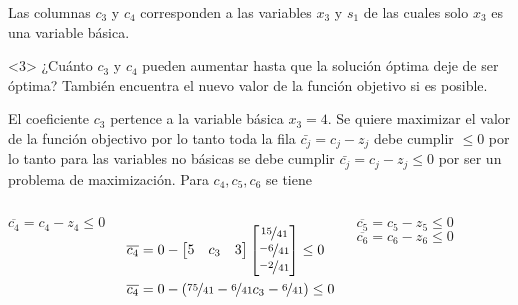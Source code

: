 \begin{frameExample}{}{}
\begin{onlyenv}
  Las columnas $c_3$ y $c_4$ corresponden a las variables $x_3$ y $s_1$ de las cuales solo $x_3$ es una variable básica.
\end{onlyenv}

\begin{onlyenv}<3>
  ¿Cuánto $c_3$ y $c_4$ pueden aumentar hasta que la solución óptima deje de ser óptima? También encuentra el nuevo valor de la función objetivo si es posible.

  El coeficiente $c_3$ pertence a la variable básica $x_3 = 4$. Se quiere maximizar el valor de la función objectivo por lo tanto toda la fila $\bar{c_j} = c_j - z_j$ debe cumplir $\leq 0$ por lo tanto para las variables \alert{no básicas} se debe cumplir $ \bar{c_j} = c_j - z_j \leq 0$ por ser un problema de maximización. Para $c_4, c_5, c_6$ se tiene

  \begin{columns}
    $\overline{c_4} = c_4 - z_4 \leq 0$

    \begin{align*}
    \overline{c_4} &= 0 - \begin{bmatrix} 5 & c_3 & 3 \end{bmatrix}
    \begin{bmatrix}
      \nicefrac{15}{41}\\ \nicefrac{-6}{41}\\ \nicefrac{-2}{41}\\
    \end{bmatrix}
      \leq 0 \\
      \overline{c_4} &= 0 - \left(\nicefrac{75}{41} - \nicefrac{6}{41}c_3 - \nicefrac{6}{41}\right) \leq 0
    \end{align*}
    
    $\overline{c_5} = c_5 - z_5 \leq 0$
    $\overline{c_6} = c_6 - z_6 \leq 0$
  \end{columns}
  
\end{onlyenv}
\end{frameExample}

